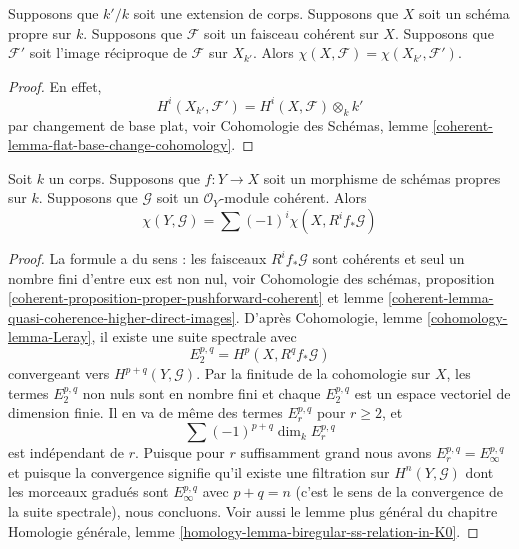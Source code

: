 \begin{lemma}
\label{lemma-euler-characteristic-extend-base-field}
Supposons que $k'/k$ soit une extension de corps. Supposons que $X$ soit un
schéma propre sur $k$. Supposons que $\mathcal{F}$ soit un faisceau
cohérent sur $X$. Supposons que $\mathcal{F}'$ soit l'image réciproque de
$\mathcal{F}$ sur $X_{k'}$. Alors $\chi(X, \mathcal{F}) = \chi(X_{k'}, \mathcal{F}')$.
\end{lemma}

\begin{proof}
En effet,
$$
H^i(X_{k'}, \mathcal{F}') = H^i(X, \mathcal{F}) \otimes_k k'
$$
par changement de base plat, voir Cohomologie des
Schémas, lemme \ref{coherent-lemma-flat-base-change-cohomology}.
\end{proof}

\begin{lemma}
\label{lemma-euler-characteristic-morphism}
Soit $k$ un corps. Supposons que $f : Y \to X$ soit un morphisme de schémas
propres sur $k$. Supposons que $\mathcal{G}$ soit un $\mathcal{O}_Y$-module cohérent. Alors
$$
\chi(Y, \mathcal{G}) = \sum (-1)^i \chi(X, R^if_*\mathcal{G})
$$
\end{lemma}

\begin{proof}
La formule a du sens : les faisceaux
$R^if_*\mathcal{G}$ sont cohérents et seul un nombre
fini d'entre eux est non nul, voir Cohomologie des
schémas, proposition
\ref{coherent-proposition-proper-pushforward-coherent} et lemme
\ref{coherent-lemma-quasi-coherence-higher-direct-images}. D'après
Cohomologie, lemme \ref{cohomology-lemma-Leray}, il existe une suite spectrale avec
$$
E_2^{p, q} = H^p(X, R^qf_*\mathcal{G})
$$
convergeant vers $H^{p + q}(Y, \mathcal{G})$. Par la finitude de la
cohomologie sur $X$, les termes $E_2^{p, q}$ non nuls sont en nombre
fini et chaque $E_2^{p, q}$ est un espace vectoriel de dimension finie.
Il en va de même des termes $E_r^{p, q}$ pour $r \geq 2$, et
$$
\sum (-1)^{p + q} \dim_k E_r^{p, q}
$$
est indépendant de $r$. Puisque pour $r$ suffisamment grand
nous avons $E_r^{p, q} = E_\infty^{p, q}$ et puisque la
convergence signifie qu'il existe une filtration sur $H^n(Y,
\mathcal{G})$ dont les morceaux gradués sont $E_\infty^{p, q}$
avec $p + q = n$ (c'est le sens de la convergence de la suite
spectrale), nous concluons. Voir aussi le lemme plus général du chapitre
Homologie générale, lemme \ref{homology-lemma-biregular-ss-relation-in-K0}.
\end{proof}








